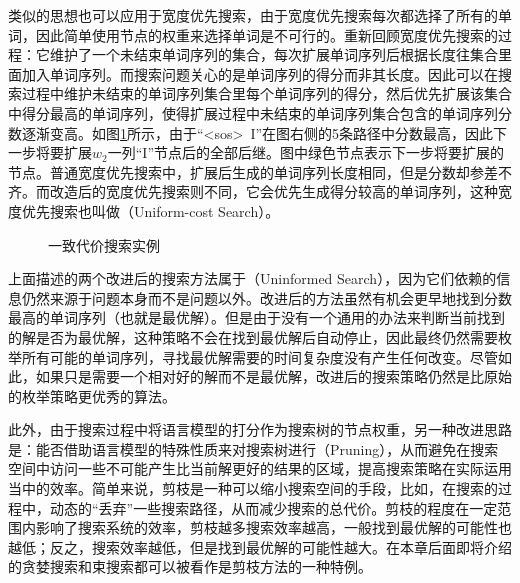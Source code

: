 \parinterval 类似的思想也可以应用于宽度优先搜索，由于宽度优先搜索每次都选择了所有的单词，因此简单使用节点的权重来选择单词是不可行的。重新回顾宽度优先搜索的过程：它维护了一个未结束单词序列的集合，每次扩展单词序列后根据长度往集合里面加入单词序列。而搜索问题关心的是单词序列的得分而非其长度。因此可以在搜索过程中维护未结束的单词序列集合里每个单词序列的得分，然后优先扩展该集合中得分最高的单词序列，使得扩展过程中未结束的单词序列集合包含的单词序列分数逐渐变高。如图\ref{fig:2-16}所示，由于“<sos>\ I”在图右侧的5条路径中分数最高，因此下一步将要扩展$w_2$一列“I”节点后的全部后继。图中绿色节点表示下一步将要扩展的节点。普通宽度优先搜索中，扩展后生成的单词序列长度相同，但是分数却参差不齐。而改造后的宽度优先搜索则不同，它会优先生成得分较高的单词序列，这种宽度优先搜索也叫做{\small{}}（Uniform-cost Search）。

\begin{figure}[htp]
    \centering
 	
	\caption{一致代价搜索实例}
    \label{fig:2-16}
\end{figure}

\parinterval 上面描述的两个改进后的搜索方法属于{\small{}}（Uninformed Search），因为它们依赖的信息仍然来源于问题本身而不是问题以外。改进后的方法虽然有机会更早地找到分数最高的单词序列（也就是最优解）。但是由于没有一个通用的办法来判断当前找到的解是否为最优解，这种策略不会在找到最优解后自动停止，因此最终仍然需要枚举所有可能的单词序列，寻找最优解需要的时间复杂度没有产生任何改变。尽管如此，如果只是需要一个相对好的解而不是最优解，改进后的搜索策略仍然是比原始的枚举策略更优秀的算法。

\parinterval 此外，由于搜索过程中将语言模型的打分作为搜索树的节点权重，另一种改进思路是：能否借助语言模型的特殊性质来对搜索树进行{\small{}}（Pruning），从而避免在搜索空间中访问一些不可能产生比当前解更好的结果的区域，提高搜索策略在实际运用当中的效率。简单来说，剪枝是一种可以缩小搜索空间的手段，比如，在搜索的过程中，动态的“丢弃”一些搜索路径，从而减少搜索的总代价。剪枝的程度在一定范围内影响了搜索系统的效率，剪枝越多搜索效率越高，一般找到最优解的可能性也越低；反之，搜索效率越低，但是找到最优解的可能性越大。在本章后面即将介绍的贪婪搜索和束搜索都可以被看作是剪枝方法的一种特例。


